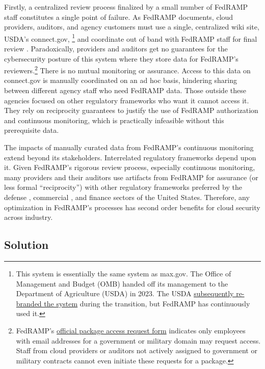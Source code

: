 \documentclass{jdf}
\begin{document}
Firstly, a centralized review process finalized by a small number of FedRAMP staff constitutes a single point of failure. As FedRAMP documents, cloud providers, auditors, and agency customers must use a single, centralized wiki site, USDA's connect.gov, \footnote{This system is essentially the same system as max.gov. The Office of Management and Budget (OMB) handed off its management to the Department of Agriculture (USDA) in 2023. The USDA \href{https://web.archive.org/web/20250617003410/https://www.fedramp.gov/2023-11-13-usda-connect-update-to-fedramp-stakeholders/}{subsequently re-branded the system} during the transition, but FedRAMP has continuously used it.} and coordinate out of band with FedRAMP staff for final review \citeyear[pp.~3,14]{fedramp_auth_playbook25}. Paradoxically, providers and auditors get no guarantees for the cybersecurity posture of this system where they store data for FedRAMP's reviewers.\footnote{FedRAMP's \href{https://web.archive.org/web/20250710063213/https://www.fedramp.gov/assets/resources/documents/Agency_Package_Request_Form.pdf}{official package access request form} indicates only employees with email addresses for a government or military domain may request access. Staff from cloud providers or auditors not actively assigned to government or military contracts cannot even initiate these requests for a package.} There is no mutual monitoring or assurance. Access to this data on connect.gov is manually coordinated on an ad hoc basis, hindering sharing between different agency staff who need FedRAMP data. Those outside these agencies focused on other regulatory frameworks who want it cannot access it. They rely on reciprocity guarantees to justify the use of FedRAMP authorization and continuous monitoring, which is practically infeasible without this prerequisite data.

The impacts of manually curated data from FedRAMP's continuous monitoring extend beyond its stakeholders. Interrelated regulatory frameworks depend upon it. Given FedRAMP's rigorous review process, especially continuous monitoring, many providers and their auditors use artifacts from FedRAMP for assurance (or less formal ``reciprocity'') with other regulatory frameworks preferred by the defense \cite{dod_fedramp_memo23}, commercial \cite{orock21}, and finance sectors of the United States. Therefore, any optimization in FedRAMP's processes has second order benefits for cloud security across industry.

\subsection{Solution}
\end{document}
